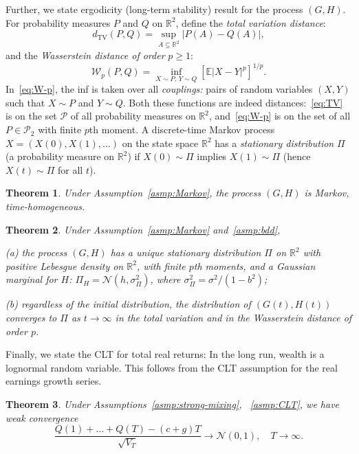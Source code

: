 \documentclass[12pt]{amsart}
\newtheorem{theorem}{Theorem}
\theoremstyle{definition}
\begin{document}
Further, we state ergodicity (long-term stability) result for the process $(G, H)$. For probability measures $P$ and $Q$ on $\mathbb R^2$, define the {\it total variation distance}: 
\begin{equation}
\label{eq:TV}
d_{\mathrm{TV}}(P, Q) = \sup\limits_{A \subseteq \mathbb R^2}|P(A) - Q(A)|,
\end{equation}
and the {\it Wasserstein distance of order} $p \ge 1$: 
\begin{equation}
\label{eq:W-p}
\mathcal W_p(P, Q) = \inf\limits_{X \sim P, \, Y \sim Q}\left[\mathbb E|X - Y|^p\right]^{1/p}.
\end{equation}
In~\eqref{eq:W-p}, the inf is taken over all {\it couplings:} pairs of random variables $(X, Y)$ such that $X \sim P$ and $Y \sim Q$. Both these functions are indeed distances:~\eqref{eq:TV} is on the set $\mathcal P$ of all probability measures on $\mathbb R^2$, and~\eqref{eq:W-p} is on the set of all $P \in \mathcal P_2$ with finite $p$th moment. A discrete-time Markov process $X = (X(0), X(1), \ldots)$ on the state space $\mathbb R^2$ has a {\it stationary distribution} $\Pi$ (a probability measure on $\mathbb R^2$) if $X(0) \sim \Pi$ implies $X(1) \sim \Pi$ (hence $X(t) \sim \Pi$ for all $t$).

\begin{theorem}
\label{thm:Markov}
Under Assumption~\ref{asmp:Markov}, the process $(G, H)$ is Markov, time-homogeneous. 
\end{theorem}

\begin{theorem}
\label{thm:ergodic}
Under Assumption~\ref{asmp:Markov} and~\ref{asmp:bdd}, 

(a) the process $(G, H)$ has a unique stationary distribution $\Pi$ on $\mathbb R^2$ with positive Lebesgue density on $\mathbb R^2$, with finite $p$th moments, and a Gaussian marginal for $H$: $\Pi_H = \mathcal N(h, \sigma^2_{\Pi})$, where 
$\sigma^2_{\Pi} = \sigma^2/(1 - b^2)$;

(b) regardless of the initial distribution, the distribution of $(G(t), H(t))$ converges to $\Pi$ as $t \to \infty$ in the total variation and in the Wasserstein distance of order $p$.  
\end{theorem}

Finally, we state the CLT for total real returns: In the long run, wealth is a lognormal random variable. This follows from the CLT assumption for the real earnings growth series. 

\begin{theorem}
Under Assumptions~\ref{asmp:strong-mixing}, ~\ref{asmp:CLT}, we have weak convergence
$$
\frac{Q(1) + \ldots + Q(T) - (c + g)T}{\sqrt{V_T}} \to \mathcal N(0, 1),\quad T \to \infty.
$$
\label{thm:CLT}
\end{theorem}
\end{document}
